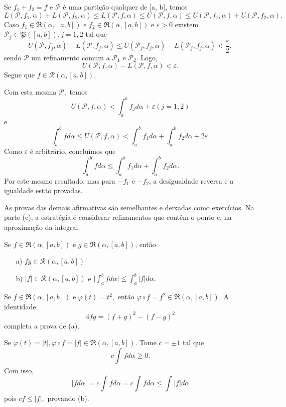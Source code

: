 \documentclass[Analysis/analysis_notes.tex]{subfiles}
\begin{document}
\begin{proof*}
	Se \(f_1 + f_2 = f\) e \(\mathcal{P}\) é uma partição qualquer de [a, b], temos
	\[
		L(\mathcal{P}, f_1, \alpha ) + L(\mathcal{P}, f_2, \alpha )\leq L(\mathcal{P}, f, \alpha ) \leq U(\mathcal{P}, f, \alpha ) \leq U(\mathcal{P}, f_1, \alpha ) + U(\mathcal{P}, f_2, \alpha ).
	\]
	Caso \(f_1\in \mathfrak{R}(\alpha , [a,b])\) e \(f_2\in \mathfrak{R}(\alpha , [a,b])\) e \(\varepsilon > 0\) existem \(\mathcal{P}_{j}\in \mathfrak{P}([a, b]), j = 1, 2\) tal que
	\[
		U(\mathcal{P}, f_{j}, \alpha ) - L(\mathcal{P}, f_{j}, \alpha )\leq U(\mathcal{P}_{j}, f_{j}, \alpha ) - L(\mathcal{P}_{j}, f_{j}, \alpha ) < \frac{\varepsilon }{2},
	\]
	sendo \(\mathcal{P}\) um refinamento comum a \(\mathcal{P}_1\) e \(\mathcal{P}_2\). Logo,
	\[
		U(\mathcal{P}, f, \alpha ) - L(\mathcal{P}, f, \alpha ) < \varepsilon .
	\]
	Segue que \(f\in \mathcal{R}(\alpha , [a, b])\).

	Com esta mesma \(\mathcal{P},\) temos
	\[
		U(\mathcal{P}, f, \alpha ) < \int_{a}^{b} f_{j}d\alpha +\varepsilon (j = 1, 2)
	\]
	e
	\[
		\int_{a}^{b}fd\alpha \leq U(\mathcal{P}, f, \alpha ) < \int_{a}^{b} f_1d\alpha + \int_{a}^{b}f_2d\alpha + 2\varepsilon .
	\]
	Como \(\varepsilon \) é arbitrário, concluímos que
	\[
		\int_{a}^{b}fd\alpha \leq \int_{a}^{b}f_1d\alpha +\int_{a}^{b}f_2d\alpha .
	\]
	Por este mesmo resultado, mas para \(-f_1\) e \(-f_2\), a desigualdade reversa e a igualdade estão provadas.

	As provas das demais afirmativas são semelhantes e deixadas como exercícios. Na parte (c), a estratégia é considerar
	refinamentos que contêm o ponto c, na aproximação da integral. \qedsymbol
\end{proof*}
\begin{theorem*}
	Se \(f\in \mathfrak{R}(\alpha , [a, b])\) e \(g\in \mathfrak{R}(\alpha , [a, b])\), então
	\begin{itemize}
		\item[a)] \(fg\in \mathcal{R}(\alpha , [a,b])\)
		\item[b)] \(|f|\in \mathcal{R}(\alpha , [a,b])\) e \(\biggl\vert \int_{a}^{b}fd\alpha  \biggr\vert\leq \int_{a}^{b}|f|d\alpha .\)
	\end{itemize}
\end{theorem*}
\begin{proof*}
	Se \(f\in \mathfrak{R}(\alpha , [a,b])\) e \(\varphi (t) = t^{2},\) então \(\varphi \circ f = f^{2}\in \mathfrak{R}(\alpha , [a,b])\). A identidade
	\[
		4fg = (f+g)^{2} - (f-g)^{2}
	\]
	completa a prova de (a).

	Se \(\varphi (t) = |t|, \varphi \circ f = |f|\in \mathfrak{R}(\alpha , [a,b])\). Tome \(c = \pm 1\) tal que
	\[
		c \int_{}^{}fd\alpha \geq 0.
	\]
	Com isso,
	\[
		\biggl\vert fd\alpha  \biggr\vert = c \int_{}^{}fd\alpha = c \int_{}^{}fd\alpha \leq \int_{}^{}|f|d\alpha
	\]
	pois \(cf\leq |f|,\) provando (b). \qedsymbol
\end{proof*}
\end{document}
